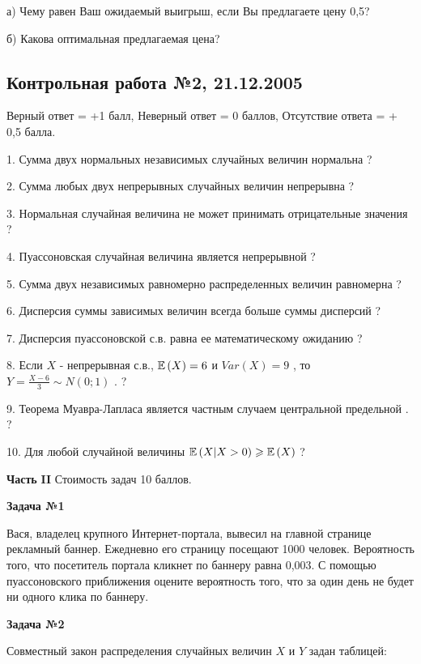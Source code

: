\documentclass[12pt, a4paper]{article}\usepackage[]{graphicx}\usepackage[]{color}
\begin{document}
	а)	Чему равен Ваш ожидаемый выигрыш, если Вы предлагаете цену 0,5?

	б)	Какова оптимальная предлагаемая цена?


	\subsection{Контрольная работа №2, 21.12.2005}




	Верный ответ = +1 балл, Неверный ответ = 0 баллов, Отсутствие ответа = + 0,5 балла.

	1. Сумма двух нормальных независимых случайных величин нормальна ?

	2. Сумма любых двух непрерывных случайных величин непрерывна ?

	3. Нормальная случайная величина не может принимать отрицательные значения ?

	4. Пуассоновская случайная величина является непрерывной ?

	5. Сумма двух независимых равномерно распределенных величин равномерна ?

	6. Дисперсия суммы зависимых величин всегда больше суммы дисперсий ?

	7. Дисперсия пуассоновской с.в. равна ее математическому ожиданию ?

	8. Если  $X$  - непрерывная с.в.,  $\mathbb{E}\left(X\right)=6$  и  $Var\left(X\right)=9$ , то  $Y=\frac{X-6}{3} \sim N\left(0;1\right)$ . ?

	9. Теорема Муавра-Лапласа является частным случаем центральной предельной . ?

	10. Для любой случайной величины  $\mathbb{E}\left(X|X>0\right)\geqslant \mathbb{E}\left(X\right)$  ?

	{\bf Часть }{\bf II} Стоимость задач 10 баллов.

	{\bf Задача №1}

	Вася, владелец крупного Интернет-портала, вывесил на главной странице рекламный баннер. Ежедневно его страницу посещают 1000 человек. Вероятность того, что посетитель портала кликнет по баннеру равна 0,003. С помощью пуассоновского приближения оцените вероятность того, что за один день не будет ни одного клика по баннеру.

	{\bf Задача №2}

	Совместный закон распределения случайных величин  $X$  и  $Y$  задан таблицей:
\end{document}
